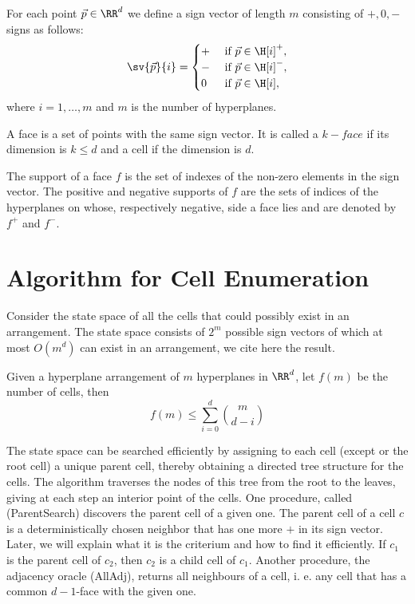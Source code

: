 For each point $\vec{p}\in\RR^{d}$ we define a sign vector of length $m$ consisting
of $+,0,-$ signs as follows:
\begin{equation*}
  \sv{\vec{p}}{i}=
  \begin{cases}
    +&\text{ if } \vec{p}\in\H[i]^+,\\
    -&\text{ if }\vec{p}\in\H[i]^-,\\
    0&\text{ if }\vec{p}\in\H[i],\\
  \end{cases}
\end{equation*}
where $i=1,\ldots, m$ and $m$ is the number of hyperplanes.
\begin{definition}
  A face is a set of points with the same sign vector. It is called
a $k-face$ if its dimension is $k\le d$ and a cell if the dimension is $d$.
\end{definition}
\begin{definition}
  The support of a face $f$ is the set of indexes of the non-zero elements
  in the sign vector. The positive and negative supports of $f$ are the sets
  of indices of the hyperplanes on whose, respectively negative, side a face lies and
  are denoted by $f^+$ and $f^-$.
\end{definition}

\section{Algorithm for Cell Enumeration}
\label{sec:AlgorithmCellEnumeration}
Consider the state space of all the cells that could possibly exist in 
an arrangement. The state space consists of $2^m$ possible sign vectors
of which at most $O(m^d)$ can exist in an arrangement, 
we cite here the result. 
\begin{theorem}{\cite[page 8]{Edelsbrunner87}}
\label{thm:NumberCells}
  Given a hyperplane arrangement of $m$ hyperplanes in $\RR^d$, let $f(m)$ be
  the number of cells, then
  \begin{equation*}
    f(m)\le \sum_{i=0}^{d}\binom{m}{d-i}
  \end{equation*}
\end{theorem}
The state space can be
searched efficiently by assigning to each cell (except or the root cell) 
a unique parent cell, thereby obtaining a directed tree structure for the
cells. The algorithm traverses the nodes of this tree from the root
to the leaves, giving at each 
step an interior point of the cells. One procedure, called 
(ParentSearch) discovers the parent cell of a 
given one. The parent cell of a cell $c$ is a deterministically chosen 
neighbor that has one more $+$ in its sign vector. Later, we will explain
what it is the criterium and how to find it efficiently. 
If $c_1$ is the parent cell of $c_2$, then $c_2$ is a child
cell of $c_1$.
Another procedure, the adjacency oracle (AllAdj), returns
all neighbours of a cell, i. e. any cell that has a common $d-1$-face 
with the given one.

